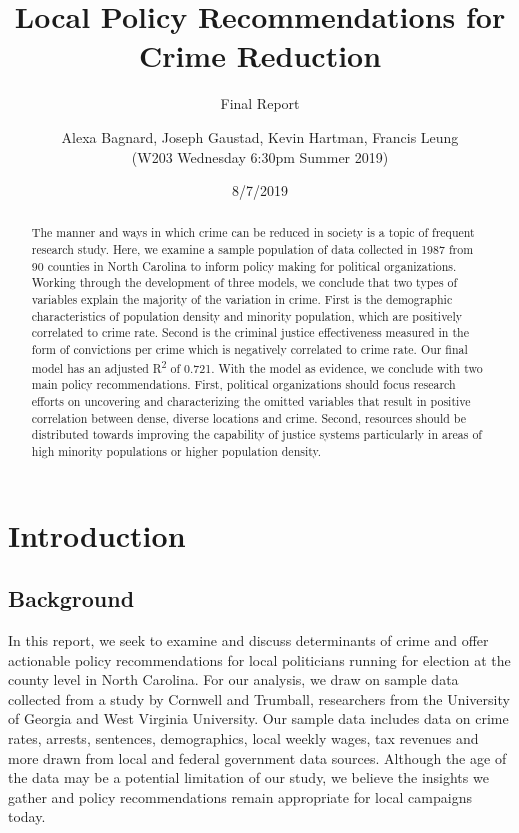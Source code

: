 \documentclass[]{article}
\title{Local Policy Recommendations for Crime Reduction}
\subtitle{Final Report}
\author{Alexa Bagnard, Joseph Gaustad, Kevin Hartman, Francis Leung \\ (W203 Wednesday 6:30pm Summer 2019)}
\date{8/7/2019}
\begin{document}
\maketitle
\begin{abstract}
The manner and ways in which crime can be reduced in society is a topic
of frequent research study. Here, we examine a sample population of data
collected in 1987 from 90 counties in North Carolina to inform policy
making for political organizations. Working through the development of
three models, we conclude that two types of variables explain the
majority of the variation in crime. First is the demographic
characteristics of population density and minority population, which are
positively correlated to crime rate. Second is the criminal justice
effectiveness measured in the form of convictions per crime which is
negatively correlated to crime rate. Our final model has an adjusted
R\textsuperscript{2} of 0.721. With the model as evidence, we conclude
with two main policy recommendations. First, political organizations
should focus research efforts on uncovering and characterizing the
omitted variables that result in positive correlation between dense,
diverse locations and crime. Second, resources should be distributed
towards improving the capability of justice systems particularly in
areas of high minority populations or higher population density.
\end{abstract}

{
\setcounter{tocdepth}{2}
\tableofcontents
}
\hypertarget{introduction}{%
\section{Introduction}\label{introduction}}

\hypertarget{background}{%
\subsection{Background}\label{background}}

In this report, we seek to examine and discuss determinants of crime and
offer actionable policy recommendations for local politicians running
for election at the county level in North Carolina. For our analysis, we
draw on sample data collected from a study by Cornwell and Trumball,
researchers from the University of Georgia and West Virginia University.
Our sample data includes data on crime rates, arrests, sentences,
demographics, local weekly wages, tax revenues and more drawn from local
and federal government data sources. Although the age of the data may be
a potential limitation of our study, we believe the insights we gather
and policy recommendations remain appropriate for local campaigns today.
\end{document}
